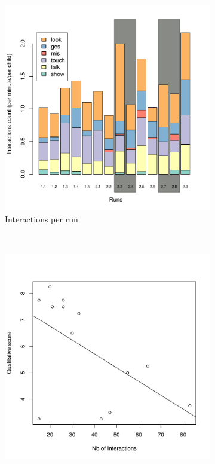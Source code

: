 \documentclass{frontiersSCNS} %
\begin{document}
\begin{figure}
        \centering
        \begin{subfigure}[b]{0.48\columnwidth}
                \includegraphics[width=\textwidth]{ranger-interactions-per-runs}
                \caption{Interactions per run}
                \label{fig:interactions-per-run}
        \end{subfigure}%
        ~ %
        \begin{subfigure}[b]{0.48\columnwidth}
                \includegraphics[width=\textwidth]{ranger-interactions-vs-qualitative-score}

\end{subfigure}
\end{figure}
\end{document}

